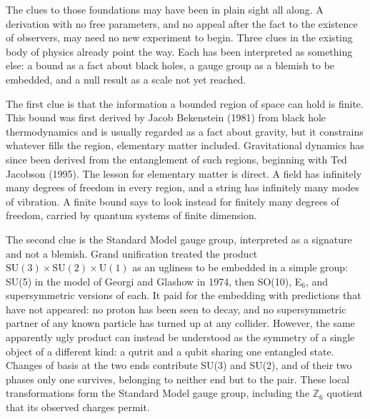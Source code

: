 The clues to those foundations may have been in plain sight all along. A derivation with no free parameters, and no appeal after the fact to the existence of observers, may need no new experiment to begin. Three clues in the existing body of physics already point the way. Each has been interpreted as something else: a bound as a fact about black holes, a gauge group as a blemish to be embedded, and a null result as a scale not yet reached.

The first clue is that the information a bounded region of space can hold is finite. This bound was first derived by Jacob Bekenstein (1981) from black hole thermodynamics and is usually regarded as a fact about gravity, but it constrains whatever fills the region, elementary matter included. Gravitational dynamics has since been derived from the entanglement of such regions, beginning with Ted Jacobson (1995). The lesson for elementary matter is direct. A field has infinitely many degrees of freedom in every region, and a string has infinitely many modes of vibration. A finite bound says to look instead for finitely many degrees of freedom, carried by quantum systems of finite dimension.

The second clue is the Standard Model gauge group, interpreted as a signature and not a blemish. Grand unification treated the product $\mathrm{SU}(3)\times\mathrm{SU}(2)\times\mathrm{U}(1)$ as an ugliness to be embedded in a simple group: SU(5) in the model of Georgi and Glashow in 1974, then SO(10), E$_6$, and supersymmetric versions of each. It paid for the embedding with predictions that have not appeared: no proton has been seen to decay, and no supersymmetric partner of any known particle has turned up at any collider. However, the same apparently ugly product can instead be understood as the symmetry of a single object of a different kind: a qutrit and a qubit sharing one entangled state. Changes of basis at the two ends contribute SU(3) and SU(2), and of their two phases only one survives, belonging to neither end but to the pair. These local transformations form the Standard Model gauge group, including the $\mathbb{Z}_6$ quotient that its observed charges permit.

